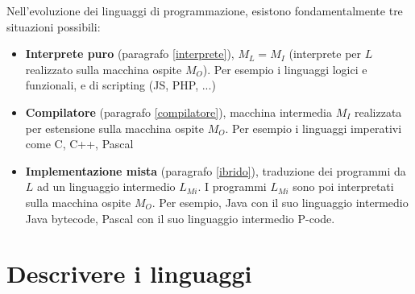 \documentclass[a4paper]{article}
\begin{document}
	Nell'evoluzione dei linguaggi di programmazione, esistono fondamentalmente tre situazioni possibili:
	\begin{itemize}
		\item \textcolor{Red3}{\textbf{Interprete puro}} (paragrafo \ref{interprete}), $M_{L} = M_{I}$ (interprete per $L$ realizzato sulla macchina ospite $M_{O}$). Per esempio i linguaggi logici e funzionali, e di scripting (JS, PHP, ...)

		\item \textcolor{Red3}{\textbf{Compilatore}} (paragrafo \ref{compilatore}), macchina intermedia $M_{I}$ realizzata per estensione sulla macchina ospite $M_{O}$. Per esempio i linguaggi imperativi come C, C++, Pascal
		
		\item \textcolor{Red3}{\textbf{Implementazione mista}} (paragrafo \ref{ibrido}), traduzione dei programmi da $L$ ad un linguaggio intermedio $L_{Mi}$. I programmi $L_{Mi}$ sono poi interpretati sulla macchina ospite $M_{O}$. Per esempio, Java con il suo linguaggio intermedio Java bytecode, Pascal con il suo linguaggio intermedio P-code.
	\end{itemize}\newpage

	\section{Descrivere i linguaggi}
\end{document}
